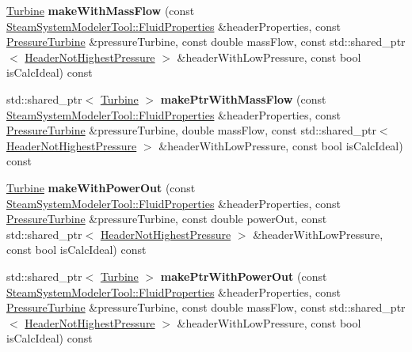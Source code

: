 \begin{DoxyCompactItemize}
\item 
\mbox{\label{class_turbine_factory_ab589b4af489fc3baa773d76d83f7417f}} 
\hyperlink{class_turbine}{Turbine} {\bfseries make\+With\+Mass\+Flow} (const \hyperlink{struct_steam_system_modeler_tool_1_1_fluid_properties}{Steam\+System\+Modeler\+Tool\+::\+Fluid\+Properties} \&header\+Properties, const \hyperlink{class_pressure_turbine}{Pressure\+Turbine} \&pressure\+Turbine, const double mass\+Flow, const std\+::shared\+\_\+ptr$<$ \hyperlink{class_header_not_highest_pressure}{Header\+Not\+Highest\+Pressure} $>$ \&header\+With\+Low\+Pressure, const bool is\+Calc\+Ideal) const
\item 
\mbox{\label{class_turbine_factory_af766c15c9b773bba15d516c4492cd804}} 
std\+::shared\+\_\+ptr$<$ \hyperlink{class_turbine}{Turbine} $>$ {\bfseries make\+Ptr\+With\+Mass\+Flow} (const \hyperlink{struct_steam_system_modeler_tool_1_1_fluid_properties}{Steam\+System\+Modeler\+Tool\+::\+Fluid\+Properties} \&header\+Properties, const \hyperlink{class_pressure_turbine}{Pressure\+Turbine} \&pressure\+Turbine, double mass\+Flow, const std\+::shared\+\_\+ptr$<$ \hyperlink{class_header_not_highest_pressure}{Header\+Not\+Highest\+Pressure} $>$ \&header\+With\+Low\+Pressure, const bool is\+Calc\+Ideal) const
\item 
\mbox{\label{class_turbine_factory_af298ec9ac7d96e670c28f7552dc238bc}} 
\hyperlink{class_turbine}{Turbine} {\bfseries make\+With\+Power\+Out} (const \hyperlink{struct_steam_system_modeler_tool_1_1_fluid_properties}{Steam\+System\+Modeler\+Tool\+::\+Fluid\+Properties} \&header\+Properties, const \hyperlink{class_pressure_turbine}{Pressure\+Turbine} \&pressure\+Turbine, const double power\+Out, const std\+::shared\+\_\+ptr$<$ \hyperlink{class_header_not_highest_pressure}{Header\+Not\+Highest\+Pressure} $>$ \&header\+With\+Low\+Pressure, const bool is\+Calc\+Ideal) const
\item 
\mbox{\label{class_turbine_factory_a5e7dfafcb9dcf319b1fd58cfd4f82970}} 
std\+::shared\+\_\+ptr$<$ \hyperlink{class_turbine}{Turbine} $>$ {\bfseries make\+Ptr\+With\+Power\+Out} (const \hyperlink{struct_steam_system_modeler_tool_1_1_fluid_properties}{Steam\+System\+Modeler\+Tool\+::\+Fluid\+Properties} \&header\+Properties, const \hyperlink{class_pressure_turbine}{Pressure\+Turbine} \&pressure\+Turbine, const double mass\+Flow, const std\+::shared\+\_\+ptr$<$ \hyperlink{class_header_not_highest_pressure}{Header\+Not\+Highest\+Pressure} $>$ \&header\+With\+Low\+Pressure, const bool is\+Calc\+Ideal) const
\end{DoxyCompactItemize}


